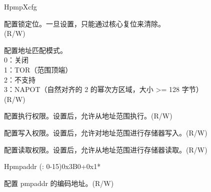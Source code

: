 \begin{register}{H}{pmpXcfg}{}
\label{regdesc:pmpXcfg}%
%
%
%
%
%
%
\regnewline%
\begin{regdesc}
\begin{reglist}
\label{fielddesc:pmpXcfgL}\item [L] 配置锁定位。一旦设置，只能通过核心复位来清除。\\
(R/W)
\label{fielddesc:pmpXcfgA}\item [A] 配置地址匹配模式。 \\
0：关闭 \\
1：TOR（范围顶端）\\
2：不支持 \\
3：NAPOT（自然对齐的 2 的幂次方区域，大小 >= 128 字节）\\
(R/W)
\label{fielddesc:pmpXcfgX}\item [X] 配置执行权限。设置后，允许从地址范围执行。(R/W)
\label{fielddesc:pmpXcfgW}\item [W] 配置写入权限。设置后，允许对地址范围进行存储器写入。(R/W)
\label{fielddesc:pmpXcfgR}\item [R] 配置读取权限。设置后，允许从地址范围进行存储器读取。(R/W)
\end{reglist}
\end{regdesc}
\end{register}

\begin{register}{H}{pmpaddr (: 0-15)}{0x3B0+0x1*}\label{regdesc:pmpaddrN}
%
\regnewline%
\begin{regdesc}\begin{reglist}
\label{fielddesc:ADDR}\item [address] 配置 pmpaddr 的编码地址。(R/W)
\end{reglist}\end{regdesc}
\end{register}
